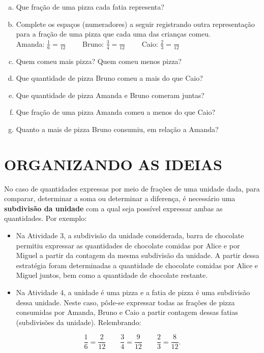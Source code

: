 \documentclass[a4,12pt]{book}
\begin{document}
\begin{enumerate}[a)]
\item  Que fração de uma pizza cada fatia representa?
 \item Complete os espaços (numeradores) a seguir registrando outra representação para a fração de uma pizza que cada uma das crianças comeu.\\ Amanda: $\frac{1}{6} =\frac{}{12}  \quad \quad$ Bruno: $\frac{3}{4} =\frac{}{12} \quad \quad$ Caio: $\frac{2}{3} =\frac{}{12}$ 
 \item Quem comeu mais pizza? Quem comeu menos pizza?
 \item Que quantidade de pizza Bruno comeu a mais do que Caio?
 \item Que quantidade de pizza Amanda e Bruno comeram juntas?
  \item Que fração de uma pizza Amanda comeu a menos do que Caio?
  \item Quanto a mais de pizza Bruno consumiu, em relação a Amanda?
\end{enumerate}


\section{ORGANIZANDO AS IDEIAS }

No caso de quantidades expressas por meio de frações de uma unidade dada, para comparar, determinar a soma ou determinar a diferença, é necessário uma {\bf subdivisão da unidade} com a qual seja possível expressar ambas as quantidades. Por exemplo:
\begin{itemize} %
  \item     Na Atividade 3, a subdivisão da unidade considerada, barra de chocolate permitiu expressar as quantidades de chocolate comidas por Alice e por Miguel a partir da contagem da mesma subdivisão da unidade. A partir dessa estratégia foram determinadas a quantidade de chocolate comidas por Alice e Miguel juntos, bem como a quantidade de chocolate restante. 
  \item     Na Atividade 4, a unidade é uma pizza e a fatia de pizza é uma subdivisão dessa unidade. Neste caso, pôde-se expressar todas as frações de pizza consumidas por Amanda, Bruno e Caio a partir contagem dessas fatias (subdivisões da unidade). Relembrando:
\end{itemize} %

$$\dfrac{1}{6} = \dfrac{2}{12} 	\quad \quad \dfrac{3}{4} = \dfrac{9}{12} \quad \quad \dfrac{2}{3} = \dfrac{8}{12}.$$
\end{document}
